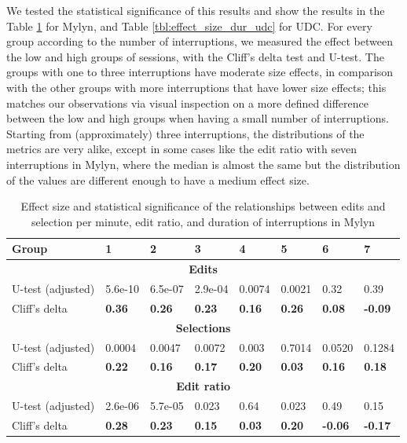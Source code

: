 \documentclass[times]{smrauth}
\begin{document}
We tested the statistical significance of this results and show the results in the Table \ref{tbl:effect_size_dur_mylyn} for Mylyn, and Table \ref{tbl:effect_size_dur_udc} for UDC. For every group according to the number of interruptions, we measured the effect between the low and high groups of sessions, with the Cliff's delta test and U-test. The groups with one to three interruptions have moderate size effects, in comparison with the other groups with more interruptions that have lower size effects; this matches our observations via visual inspection on a more defined difference between the low and high groups when having a small number of interruptions. Starting from (approximately) three interruptions, the distributions of the metrics are very alike, except in some cases like the edit ratio with seven interruptions in Mylyn, where the median is almost the same but the distribution of the values are different enough to have a medium effect size. 

\begin{table}[ht!]
	\tiny
	\renewcommand{\arraystretch}{1.3}
	\caption{Effect size and statistical significance of the relationships between edits and selection per minute, edit ratio, and duration of interruptions in Mylyn} %
	\label{tbl:effect_size_dur_mylyn}
	\centering
	\begin{tabular}{l | p{1cm} | p{1cm} | p{1cm} | p{1cm} | p{1cm} | p{1cm} | p{1cm}} 
		Group & 1 & 2 & 3 & 4 & 5 & 6 & 7  \\  
		\hline
		\multicolumn{8}{c}{\textbf{Edits}} \\
		\hline
		U-test (adjusted) & 5.6e-10 & 6.5e-07 & 2.9e-04 & 0.0074 & 0.0021 & 0.32 &  0.39\\
		\hline
		Cliff's delta & \textbf{0.36} & \textbf{0.26} & \textbf{0.23} & \textbf{0.16} & \textbf{0.26} & \textbf{0.08} & \textbf{-0.09} \\
		\hline
		
		\multicolumn{8}{c}{\textbf{Selections}} \\
		\hline 
		U-test (adjusted) & 0.0004 & 0.0047 & 0.0072 & 0.003 & 0.7014 & 0.0520 & 0.1284 \\
		\hline
		Cliff's delta & \textbf{0.22} & \textbf{0.16} & \textbf{0.17} & \textbf{0.20} & \textbf{0.03} & \textbf{0.16} & \textbf{0.18}  \\  
		\hline
		
		\multicolumn{8}{c}{\textbf{Edit ratio}} \\
		\hline 
		U-test (adjusted) & 2.6e-06 & 5.7e-05 & 0.023 & 0.64 & 0.023 & 0.49 & 0.15 \\
		\hline 
		Cliff's delta & \textbf{0.28} & \textbf{0.23} & \textbf{0.15} & \textbf{0.03} & \textbf{0.20} & \textbf{-0.06} & \textbf{-0.17}  \\
		\hline
		
	\end{tabular}
\end{table}
\end{document}
